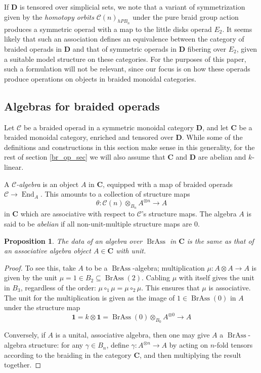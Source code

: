 \documentclass[12pt]{article}
\DeclareMathOperator{\End}{End}
\DeclareMathOperator{\BrAss}{BrAss}
\newcommand{\CC} {\mathcal{C}}
\newcommand{\bC} {\mathbf{C}}
\newcommand{\one} {\mathbf{1}}
\newcommand{\bD} {\mathbf{D}}
\theoremstyle{plain}
\newtheorem{prop}[thm]{Proposition}
\theoremstyle{definition}
\theoremstyle{remark}
\begin{document}
If $\bD$ is tensored over simplicial sets, we note that a variant of symmetrization given by the \emph{homotopy orbits} $\CC(n)_{hPB_n}$ under the pure braid group action produces a symmetric operad with a map to the little disks operad $E_2$.  It seems likely that such an association defines an equivalence between the category of braided operads in $\bD$ and that of symmetric operads in $\bD$ fibering over $E_2$, given a suitable model structure on these categories.  For the purposes of this paper, such a formulation will not be relevant, since our focus is on how these operads produce operations on objects in braided monoidal categories.

\subsection{Algebras for braided operads} \label{op_alg_section}

Let $\CC$ be a braided operad in a symmetric monoidal category $\bD$, and let $\bC$ be a braided monoidal category, enriched and tensored over $\bD$.  While some of the definitions and constructions in this section make sense in this generality, for the rest of section \ref{br_op_sec} we will also assume that $\bC$ and $\bD$ are abelian and $k$-linear.

A \emph{$\CC$-algebra} is an object $A$ in $\bC$, equipped with a map of braided operads $\CC \to \End_A$. This amounts to a collection of structure maps 
%
$$\theta: \CC(n) \otimes_{B_n} A^{\otimes n} \to A$$
%
in $\bC$ which are associative with respect to $\CC$'s structure maps.  The algebra $A$ is said to be \emph{abelian} if all non-unit-multiple structure maps are 0. 

\begin{prop} \label{assoc_prop} The data of an algebra over $\BrAss$ in $\bC$ is the same as that of an associative algebra object $A \in \bC$ with unit. \end{prop}

\begin{proof} To see this, take $A$ to be a $\BrAss$-algebra; multiplication $\mu: A \otimes A \to A$ is given by the unit $\mu = 1 \in B_2 \subseteq \BrAss(2)$.  Cabling $\mu$ with itself gives the unit in $B_3$, regardless of the order: $\mu \circ_1 \mu = \mu \circ_2 \mu$.  This ensures that $\mu$ is associative.  The unit for the multiplication is given as the image of $1 \in \BrAss(0)$ in $A$ under the structure map 
%
$$\one = k \otimes \one = \BrAss(0) \otimes_{B_0} A^{\otimes 0} \to A$$

Conversely, if $A$ is a unital, associative algebra, then one may give $A$ a $\BrAss$-algebra structure: for any $\gamma \in B_n$, define $\gamma: A^{\otimes n} \to A$ by acting on $n$-fold tensors according to the braiding in the category $\bC$, and then multiplying the result together.

\end{proof}
\end{document}
